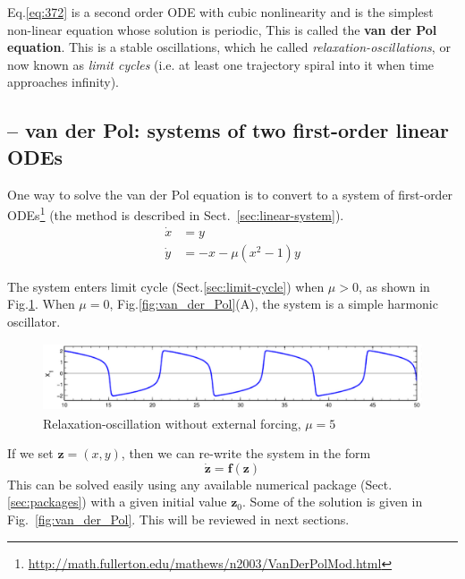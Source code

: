 Eq.\ref{eq:372} is a second order ODE with cubic nonlinearity and is the
simplest non-linear equation whose solution is periodic, This is called the {\bf
van der Pol equation}.
This is a stable oscillations, which he called {\it relaxation-oscillations}, or
now known as {\it limit cycles} (i.e. at least one trajectory spiral into it
when time approaches infinity).

\subsection{-- van der Pol: systems of two first-order linear ODEs}
\label{sec:van-der-Pol-2-ODEs}

One way to solve the van der Pol equation is to convert to a system of
first-order
ODEs\footnote{\url{http://math.fullerton.edu/mathews/n2003/VanDerPolMod.html}}
(the method is described in Sect.~\ref{sec:linear-system}).
\begin{equation}
  \label{eq:580}
  \begin{split}
    \dot{x} &= y \\
    \dot{y} &= -x - \mu(x^2-1)y
  \end{split}
\end{equation}

The system enters limit cycle (Sect.\ref{sec:limit-cycle}) when $\mu > 0$, as
shown in Fig.\ref{fig:vanderPol_harmonic-oscillation}. When $\mu=0$,
Fig.\ref{fig:van_der_Pol}(A), the system is a simple harmonic oscillator.

\begin{figure}[hbt]
  \centerline{\includegraphics[height=2cm,
    angle=0]{./images/vanderPol_harmonic-oscillation.eps}}
  \caption{Relaxation-oscillation without external forcing, $\mu=5$}
  \label{fig:vanderPol_harmonic-oscillation}
\end{figure}

If we set $\mathbf{z}=(x,y)$, then we can re-write the system in the form 
\begin{equation}
  \label{eq:581}
  \dot{\mathbf{z}} = \mathbf{f}(\mathbf{z})
\end{equation}
This can be solved easily using any available numerical package
(Sect.\ref{sec:packages}) with a given initial value $\mathbf{z}_0$.
Some of the solution is given in Fig.~\ref{fig:van_der_Pol}. This will
be reviewed in next sections.

